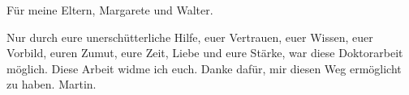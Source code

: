 \begin{flushright}
Für meine Eltern, Margarete und Walter.
\vspace{5mm}

Nur durch eure unerschütterliche Hilfe, euer Vertrauen, euer Wissen, euer Vorbild, euren Zumut, eure Zeit, Liebe und eure Stärke, war diese Doktorarbeit möglich. Diese Arbeit widme ich euch. Danke dafür, mir diesen Weg ermöglicht zu haben. Martin.
\end{flushright}
